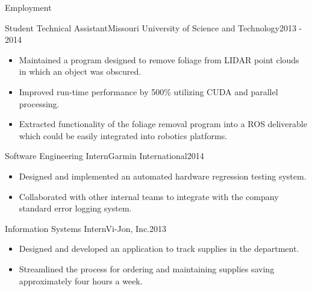 \documentclass[]{mcdowellcv}
\begin{document}
\begin{cvsection}{Employment}
\begin{rockmech}
    \begin{cvsubsection}[2]{Student Technical Assistant}{Missouri University of Science and Technology}{2013 - 2014}        
        \begin{itemize}
            \item Maintained a program designed to remove foliage from LIDAR point clouds in which an object was obscured.
            \item Improved run-time performance by 500\% utilizing CUDA and parallel processing.
            \item Extracted functionality of the foliage removal program into a ROS deliverable which could be easily integrated into robotics platforms.
        \end{itemize}
    \end{cvsubsection}
\end{rockmech}
    
\begin{garmin}
    \begin{cvsubsection}{Software Engineering Intern}{Garmin International}{2014}   
        \begin{itemize}
            \item Designed and implemented an automated hardware regression testing system.
            \item Collaborated with other internal teams to integrate with the company standard error logging system.
        \end{itemize}
    \end{cvsubsection}
\end{garmin}

\begin{vijon}
    \begin{cvsubsection}{Information Systems Intern}{Vi-Jon, Inc.}{2013}
        \begin{itemize}
            \item Designed and developed an application to track supplies in the department.
            \item Streamlined the process for ordering and maintaining supplies saving approximately four hours a week.
        \end{itemize}
    \end{cvsubsection}
\end{vijon}

\end{cvsection}
\end{document}
